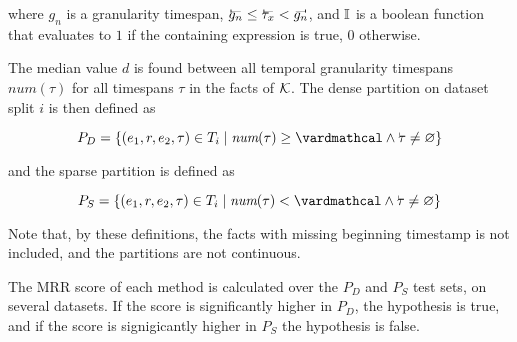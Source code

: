 where $g_n$ is a granularity timespan, $\timebegin{g_n} \leq \timebegin{\tau_x} < \timeend{g_n}$, and $\mathbb{I}$ is a boolean function that evaluates to $1$ if the containing expression is true, $0$ otherwise.

The median value $d$ is found between all temporal granularity timespans $\mathit{num}(\tau)$ for all timespans $\tau$ in the facts of $\mathcal{K}$. The dense partition on dataset split $i$ is then defined as

\begin{equation}
P_D = \{ (e_1, r, e_2, \tau) \in \test_i \mid \textit{num}(\tau) \geq \vard \wedge \timebegin{\tau} \neq \varmiss \}
\end{equation}

\noindent
and the sparse partition is defined as 

\begin{equation}
P_S = \{ (e_1, r, e_2, \tau) \in \test_i \mid \textit{num}(\tau) < \vard \wedge \timebegin{\tau} \neq \varmiss \}
\end{equation}

Note that, by these definitions, the facts with missing beginning timestamp is not included, and the partitions are not continuous.

The MRR score of each method is calculated over the $P_D$ and $P_S$ test sets, on several datasets. If the score is significantly higher in $P_D$, the hypothesis is true, and if the score is signigicantly higher in $P_S$ the hypothesis is false.

\begin{comment}
foreach fact in dataset
    fact_count_i_timespan(fact) >> array
done
sort(array)
median(array)
\end{comment}